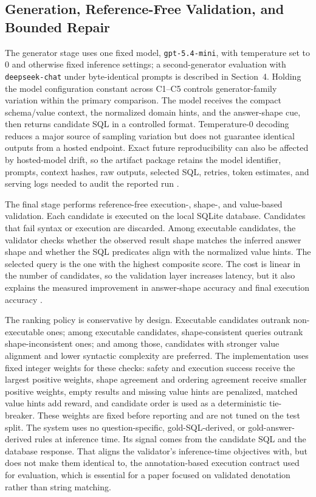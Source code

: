 \documentclass[cmc,article,submit,moreauthors,pdftex]{Definitions/tsp}
\begin{document}
\subsection{Generation, Reference-Free Validation, and Bounded Repair}\label{sect:m6}

The generator stage uses one fixed model, \texttt{gpt-5.4-mini}, with temperature set to 0 and otherwise fixed inference settings; a second-generator evaluation with \texttt{deepseek-chat} under byte-identical prompts is described in Section~4. Holding the model configuration constant across C1--C5 controls generator-family variation within the primary comparison. The model receives the compact schema/value context, the normalized domain hints, and the answer-shape cue, then returns candidate SQL in a controlled format. Temperature-0 decoding reduces a major source of sampling variation but does not guarantee identical outputs from a hosted endpoint. Exact future reproducibility can also be affected by hosted-model drift, so the artifact package retains the model identifier, prompts, context hashes, raw outputs, selected SQL, retries, token estimates, and serving logs needed to audit the reported run \cite{chang2023prompt,nan2023enhancing,sun2023sqlprompt}.

The final stage performs reference-free execution-, shape-, and value-based validation. Each candidate is executed on the local SQLite database. Candidates that fail syntax or execution are discarded. Among executable candidates, the validator checks whether the observed result shape matches the inferred answer shape and whether the SQL predicates align with the normalized value hints. The selected query is the one with the highest composite score. The cost is linear in the number of candidates, so the validation layer increases latency, but it also explains the measured improvement in answer-shape accuracy and final execution accuracy \cite{wang2021executions,li2024select,huang2024survey}.

The ranking policy is conservative by design. Executable candidates outrank non-executable ones; among executable candidates, shape-consistent queries outrank shape-inconsistent ones; and among those, candidates with stronger value alignment and lower syntactic complexity are preferred. The implementation uses fixed integer weights for these checks: safety and execution success receive the largest positive weights, shape agreement and ordering agreement receive smaller positive weights, empty results and missing value hints are penalized, matched value hints add reward, and candidate order is used as a deterministic tie-breaker. These weights are fixed before reporting and are not tuned on the test split. The system uses no question-specific, gold-SQL-derived, or gold-answer-derived rules at inference time. Its signal comes from the candidate SQL and the database response. That aligns the validator's inference-time objectives with, but does not make them identical to, the annotation-based execution contract used for evaluation, which is essential for a paper focused on validated denotation rather than string matching.
\end{document}
